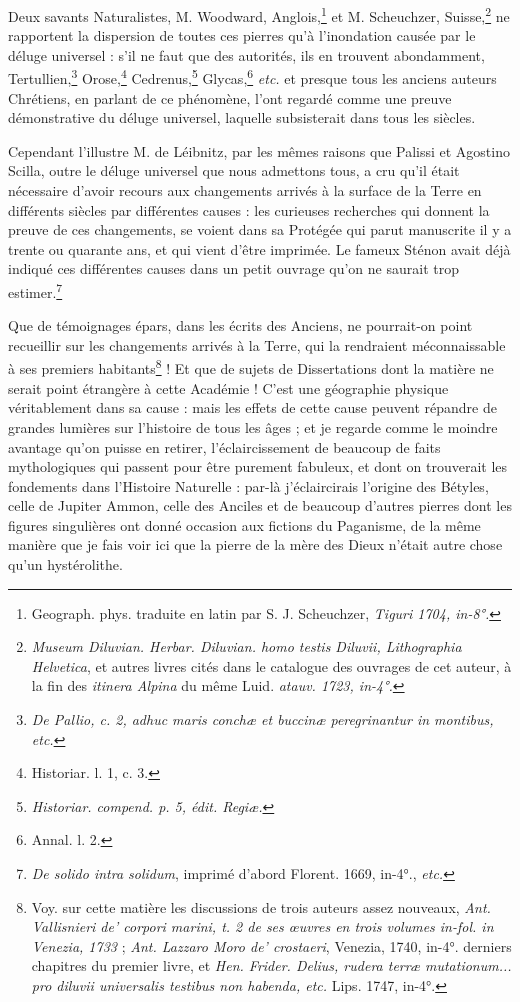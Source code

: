\documentclass[a4paper, 11pt, oneside, polutonikogreek, french]{article}
\begin{document}
Deux savants Naturalistes, M. Woodward, Anglois,\footnote{Geograph. phys. traduite en latin par S. J. Scheuchzer, \emph{Tiguri 1704, in-8°.}} et M. Scheuchzer, Suisse,\footnote{\emph{Museum Diluvian. Herbar. Diluvian. homo testis Diluvii, Lithographia Helvetica}, et autres livres cités dans le catalogue des ouvrages de cet auteur, à la fin des \emph{itinera Alpina} du même Luid. \emph{atauv. 1723, in-4°.}} ne rapportent la dispersion de toutes ces pierres qu'à l'inondation causée par le déluge universel : s'il ne faut que des autorités, ils en trouvent abondamment, Tertullien,\footnote{\emph{De Pallio, c. 2, adhuc maris conchæ et buccinæ peregrinantur in montibus, etc.}} Orose,\footnote{Historiar. l. 1, c. 3.} Cedrenus,\footnote{\emph{Historiar. compend. p. 5, édit. Regiæ.}} Glycas,\footnote{Annal. l. 2.} \emph{etc.} et presque tous les anciens auteurs Chrétiens, en parlant de ce phénomène, l'ont regardé comme une preuve démonstrative du déluge universel, laquelle subsisterait dans tous les siècles.

Cependant l'illustre M. de Léibnitz, par les mêmes raisons que Palissi et Agostino Scilla, outre le déluge universel que nous admettons tous, a cru qu'il était nécessaire d'avoir recours aux changements arrivés à la surface de la Terre en différents siècles par différentes causes : les curieuses recherches qui donnent la preuve de ces changements, se voient dans sa Protégée qui parut manuscrite il y a trente ou quarante ans, et qui vient d'être imprimée. Le fameux Sténon avait déjà indiqué ces différentes causes dans un petit ouvrage qu'on ne saurait trop estimer.\footnote{\emph{De solido intra solidum}, imprimé d'abord Florent. 1669, in-4°., \emph{etc.}}

Que de témoignages épars, dans les écrits des Anciens, ne pourrait-on point recueillir sur les changements arrivés à la Terre, qui la rendraient méconnaissable à ses premiers habitants\footnote{Voy. sur cette matière les discussions de trois auteurs assez nouveaux, \emph{Ant. Vallisnieri de' corpori marini, t. 2 de ses œuvres en trois volumes in-fol. in Venezia, 1733} ; \emph{Ant. Lazzaro Moro de' crostaeri}, Venezia, 1740, in-4°. derniers chapitres du premier livre, et \emph{Hen. Frider. Delius, rudera terræ mutationum... pro diluvii universalis testibus non habenda, etc.} Lips. 1747, in-4°.} ! Et que de sujets de Dissertations dont la matière ne serait point étrangère à cette Académie ! C'est une géographie physique véritablement dans sa cause : mais les effets de cette cause peuvent répandre de grandes lumières sur l'histoire de tous les âges ; et je regarde comme le moindre avantage qu'on puisse en retirer, l'éclaircissement de beaucoup de faits mythologiques qui passent pour être purement fabuleux, et dont on trouverait les fondements dans l'Histoire Naturelle : par-là j'éclaircirais l'origine des Bétyles, celle de Jupiter Ammon, celle des Anciles et de beaucoup d'autres pierres dont les figures singulières ont donné occasion aux fictions du Paganisme, de la même manière que je fais voir ici que la pierre de la mère des Dieux n'était autre chose qu'un hystérolithe.
\end{document}
